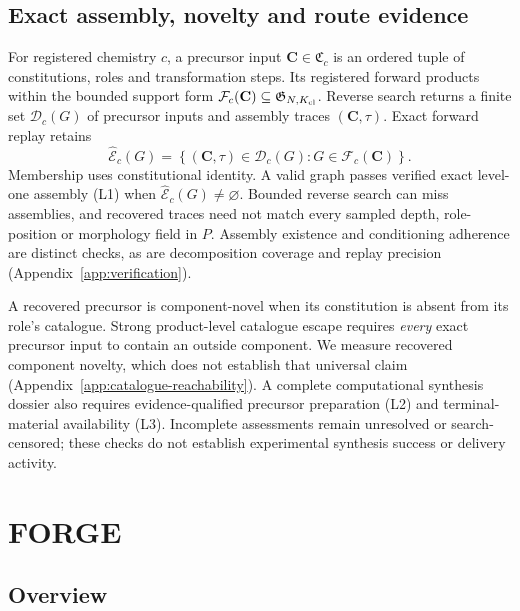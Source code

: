 \documentclass{article}
\theoremstyle{definition}
\begin{document}
\subsection{Exact assembly, novelty and route evidence}
For registered chemistry $c$, a precursor input $\mathbf C\in\mathfrak C_c$ is an ordered tuple
of constitutions, roles and transformation steps. Its registered forward products within the
bounded support form $\mathcal F_c(\mathbf C)\subseteq\mathfrak G_{N,K_{\rm cl}}$.
Reverse search returns a finite set $\mathcal D_c(G)$ of precursor inputs and assembly traces
$(\mathbf C,\tau)$. Exact forward replay retains
\begin{equation}
    \widehat{\mathcal E}_c(G)=
    \left\{(\mathbf C,\tau)\in\mathcal D_c(G):G\in\mathcal F_c(\mathbf C)\right\}.
    \label{eq:main-exact-traces}
\end{equation}
Membership uses constitutional identity. A valid graph passes verified exact level-one assembly
(L1) when $\widehat{\mathcal E}_c(G)\neq\varnothing$. Bounded reverse search can miss assemblies,
and recovered traces need not match every sampled depth, role-position or morphology field in $P$.
Assembly existence and conditioning adherence are distinct checks, as are decomposition coverage
and replay precision (Appendix~\ref{app:verification}).

A recovered precursor is component-novel when its constitution is absent from its role's catalogue.
Strong product-level catalogue escape requires \emph{every} exact precursor input to contain an
outside component. We measure recovered component novelty, which does not establish that universal
claim (Appendix~\ref{app:catalogue-reachability}). A complete computational synthesis dossier also
requires evidence-qualified precursor preparation (L2) and terminal-material availability (L3).
Incomplete assessments remain unresolved or search-censored; these checks do not establish
experimental synthesis success or delivery activity.

\section{FORGE}
\label{sec:method}

\subsection{Overview}
\label{sec:forge-overview}
\end{document}
